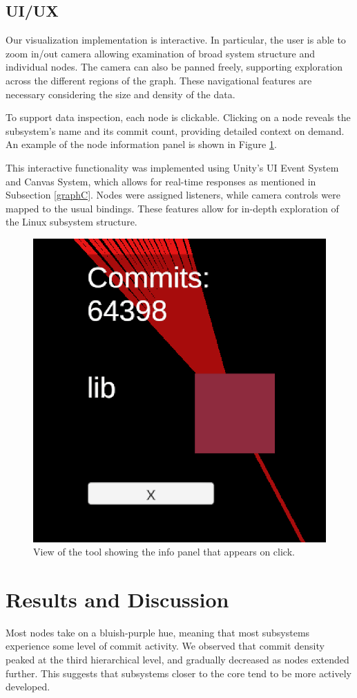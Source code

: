 \documentclass[conference]{IEEEtran}
\begin{document}
\subsection{UI/UX}
Our visualization implementation is interactive. In particular, the user is able to zoom in/out camera allowing examination of broad system structure and individual nodes. The camera can also be panned freely, supporting exploration across the different regions of the graph. These navigational features are necessary considering the size and density of the data. 

To support data inspection, each node is clickable. Clicking on a node reveals the subsystem’s name and its commit count, providing detailed context on demand. An example of the node information panel is shown in Figure \ref{inner}.

This interactive functionality was implemented using Unity's UI Event System and Canvas System, which allows for real-time responses as mentioned in Subsection \ref{graphC}. Nodes were assigned listeners, while camera controls were mapped to the usual bindings. These features allow for in-depth exploration of the Linux subsystem structure.

\begin{figure}[h!]
	\centering
	\includegraphics[width = .3\textwidth]{commitPanel.png}
	\caption{View of the tool showing the info panel that appears on click.}
	\label{inner}
\end{figure}






\section{Results and Discussion}
\label{resAndDisc}

Most nodes take on a bluish-purple hue, meaning that most subsystems experience some level of commit activity. We observed that commit density peaked at the third hierarchical level, and gradually decreased as nodes extended further. This suggests that subsystems closer to the core tend to be more actively developed.
\end{document}
